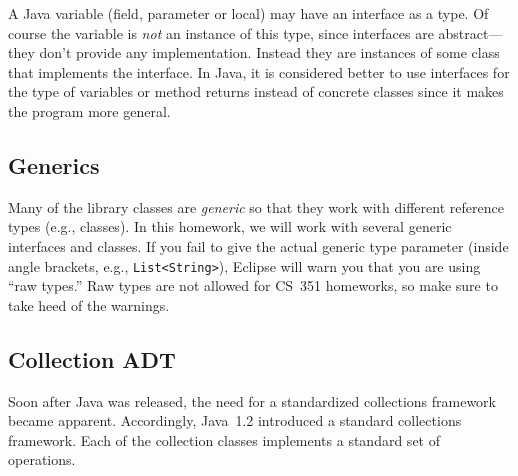 \documentclass[11pt]{article}
\begin{document}
A Java variable (field, parameter or local) may have an interface as a
type.  Of course the variable is \emph{not} an instance of this type,
since interfaces are abstract---they don't provide any implementation.
Instead they are instances of some class that implements the interface.
In Java, it is considered better to use interfaces for the type of
variables or method returns instead of concrete classes since it makes
the program more general.


\subsection{Generics}

Many of the library classes are \emph{generic} so that they work with
different reference types (e.g., classes).
In this homework, we will work with several generic interfaces and
classes.  If you fail to give the actual generic type parameter
(inside angle brackets, e.g., \verb|List<String>|), Eclipse will
warn you that you are using ``raw types.'' Raw types are not allowed
for CS~351 homeworks, so make sure to take heed of the warnings.

\subsection{Collection ADT}

Soon after Java was released, the need for a standardized collections
framework became apparent.  Accordingly, Java~1.2 introduced a
standard collections framework.  Each of the collection classes
implements a standard set of operations.
\end{document}

